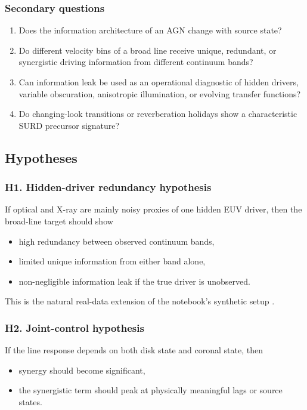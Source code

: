 \documentclass{article}
\begin{document}
\subsubsection{Secondary questions}

\begin{enumerate}
    \item Does the information architecture of an AGN change with source state?
    \item Do different velocity bins of a broad line receive unique, redundant, or synergistic driving information from different continuum bands?
    \item Can information leak be used as an operational diagnostic of hidden drivers, variable obscuration, anisotropic illumination, or evolving transfer functions?
    \item Do changing-look transitions or reverberation holidays show a characteristic SURD precursor signature?
\end{enumerate}

\subsection{Hypotheses}

\subsubsection{H1. Hidden-driver redundancy hypothesis}

If optical and X-ray are mainly noisy proxies of one hidden EUV driver, then the broad-line target should show
\begin{itemize}
    \item high redundancy between observed continuum bands,
    \item limited unique information from either band alone,
    \item non-negligible information leak if the true driver is unobserved.
\end{itemize}

This is the natural real-data extension of the notebook's synthetic setup \cite{AGN_SURD_notebook}.

\subsubsection{H2. Joint-control hypothesis}

If the line response depends on both disk state and coronal state, then
\begin{itemize}
    \item synergy should become significant,
    \item the synergistic term should peak at physically meaningful lags or source states.
\end{itemize}
\end{document}
